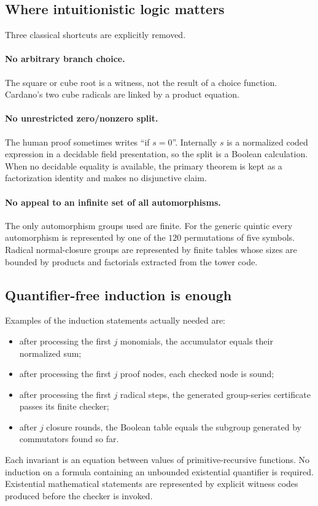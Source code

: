 \subsection{Where intuitionistic logic matters}

Three classical shortcuts are explicitly removed.

\paragraph{No arbitrary branch choice.}
The square or cube root is a witness, not the result of a choice function.
Cardano's two cube radicals are linked by a product equation.

\paragraph{No unrestricted zero/nonzero split.}
The human proof sometimes writes ``if $s=0$''.  Internally $s$ is a normalized
coded expression in a decidable field presentation, so the split is a Boolean
calculation.  When no decidable equality is available, the primary theorem is
kept as a factorization identity and makes no disjunctive claim.

\paragraph{No appeal to an infinite set of all automorphisms.}
The only automorphism groups used are finite.  For the generic quintic every
automorphism is represented by one of the $120$ permutations of five
symbols.  Radical normal-closure groups are represented by finite tables whose
sizes are bounded by products and factorials extracted from the tower code.

\subsection{Quantifier-free induction is enough}

Examples of the induction statements actually needed are:

\begin{itemize}
\item after processing the first $j$ monomials, the accumulator equals their
  normalized sum;
\item after processing the first $j$ proof nodes, each checked node is sound;
\item after processing the first $j$ radical steps, the generated group-series
  certificate passes its finite checker;
\item after $j$ closure rounds, the Boolean table equals the subgroup generated
  by commutators found so far.
\end{itemize}

Each invariant is an equation between values of primitive-recursive functions.
No induction on a formula containing an unbounded existential quantifier is
required.  Existential mathematical statements are represented by explicit
witness codes produced before the checker is invoked.
